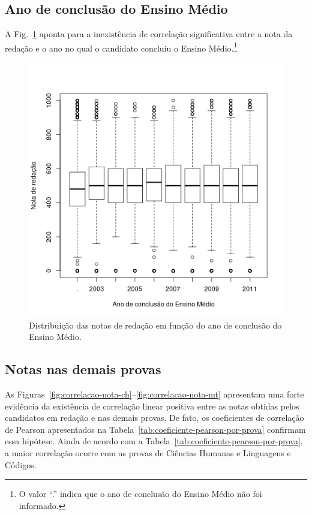 \documentclass[12pt]{article}
\newcommand{\reffig}[1]{Fig.~\ref{fig:#1}}
\newcommand{\reftab}[1]{Tabela~\ref{tab:#1}}
\begin{document}
\subsection{Ano de conclusão do Ensino Médio}
A \reffig{correlacao-ano-concluiu} aponta para a inexistência de correlação significativa entre a nota da redação e o ano no qual o candidato concluiu o Ensino Médio.\footnote{O valor ``.'' indica que o ano de conclusão do Ensino Médio não foi informado.}
\begin{figure}[H]
\centering\includegraphics[width=.45\linewidth]{../correlacao_ano_concluiu.png}
\caption{Distribuição das notas de redação em função do ano de conclusão do Ensino Médio.}
\label{fig:correlacao-ano-concluiu}
\end{figure}

\subsection{Notas nas demais provas}
As Figuras~\ref{fig:correlacao-nota-ch}--\ref{fig:correlacao-nota-mt} apresentam uma forte evidência da existência de correlação linear positiva entre as notas obtidas pelos candidatos em redação e nas demais provas.
De fato, os coeficientes de correlação de Pearson apresentados na \reftab{coeficiente-pearson-por-prova} confirmam essa hipótese.
Ainda de acordo com a \reftab{coeficiente-pearson-por-prova}, a maior correlação ocorre com as provas de Ciências Humanas e Linguagens e Códigos.
\end{document}
